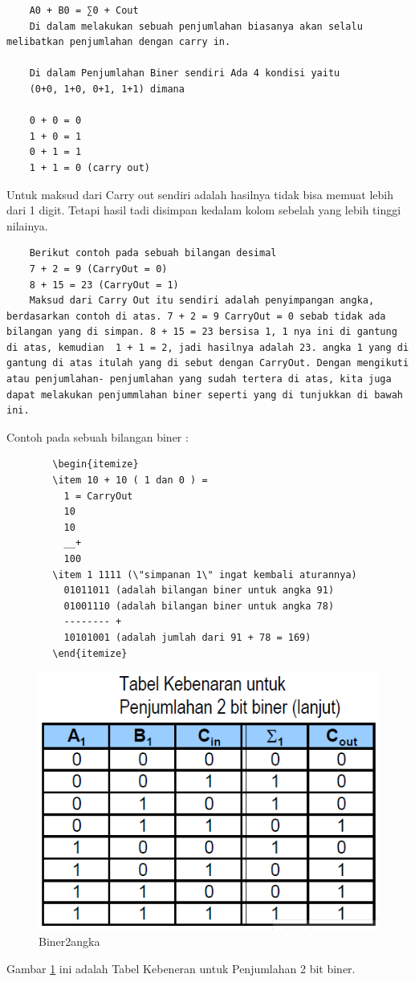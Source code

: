 \begin{verbatim}
	A0 + B0 = ∑0 + Cout
	Di dalam melakukan sebuah penjumlahan biasanya akan selalu melibatkan penjumlahan dengan carry in.

	Di dalam Penjumlahan Biner sendiri Ada 4 kondisi yaitu
	(0+0, 1+0, 0+1, 1+1) dimana

	0 + 0 = 0
	1 + 0 = 1
	0 + 1 = 1
	1 + 1 = 0 (carry out) 
\end{verbatim}
	Untuk maksud dari Carry out sendiri adalah hasilnya tidak bisa memuat lebih dari 1 digit. Tetapi  hasil tadi disimpan kedalam kolom sebelah yang lebih tinggi nilainya.
\begin{verbatim}
	Berikut contoh pada sebuah bilangan desimal
	7 + 2 = 9 (CarryOut = 0)
	8 + 15 = 23 (CarryOut = 1)
	Maksud dari Carry Out itu sendiri adalah penyimpangan angka, berdasarkan contoh di atas. 7 + 2 = 9 CarryOut = 0 sebab tidak ada bilangan yang di simpan. 8 + 15 = 23 bersisa 1, 1 nya ini di gantung di atas, kemudian  1 + 1 = 2, jadi hasilnya adalah 23. angka 1 yang di gantung di atas itulah yang di sebut dengan CarryOut. Dengan mengikuti atau penjumlahan- penjumlahan yang sudah tertera di atas, kita juga dapat melakukan penjummlahan biner seperti yang di tunjukkan di bawah ini.
\end{verbatim}
	Contoh pada sebuah bilangan biner :
	\begin{verbatim}
		\begin{itemize}
		\item 10 + 10 ( 1 dan 0 ) =
		  1 = CarryOut
		  10
		  10
		  __+
		  100
		\item 1 1111 (\"simpanan 1\" ingat kembali aturannya)
		  01011011 (adalah bilangan biner untuk angka 91)
		  01001110 (adalah bilangan biner untuk angka 78)
		  -------- +
		  10101001 (adalah jumlah dari 91 + 78 = 169)
		\end{itemize}
	\end{verbatim}

			\begin{figure} [ht]
				\centerline{\includegraphics[width=1\textwidth]{figures/Biner2angka.png}}
				\caption{Biner2angka}
				\label{Biner2angka}
			\end{figure}
Gambar \ref{Biner2angka} ini adalah Tabel Kebeneran untuk Penjumlahan 2 bit biner.

